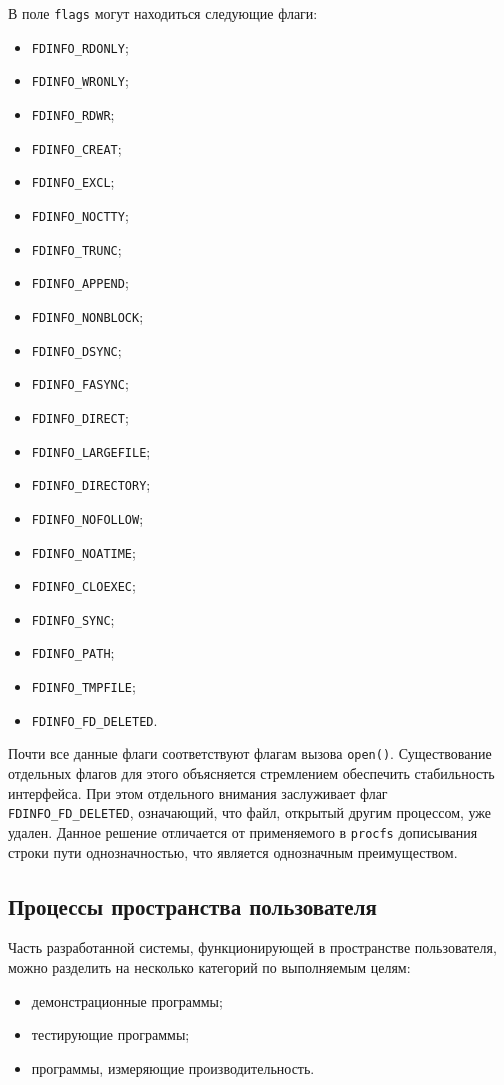 В поле \texttt{flags} могут находиться следующие флаги:
\begin{itemize}
\item \texttt{FDINFO\_RDONLY};
\item \texttt{FDINFO\_WRONLY};
\item \texttt{FDINFO\_RDWR};
\item \texttt{FDINFO\_CREAT}; 
\item \texttt{FDINFO\_EXCL};
\item \texttt{FDINFO\_NOCTTY};
\item \texttt{FDINFO\_TRUNC};
\item \texttt{FDINFO\_APPEND};
\item \texttt{FDINFO\_NONBLOCK};
\item \texttt{FDINFO\_DSYNC};
\item \texttt{FDINFO\_FASYNC};
\item \texttt{FDINFO\_DIRECT};
\item \texttt{FDINFO\_LARGEFILE};
\item \texttt{FDINFO\_DIRECTORY};
\item \texttt{FDINFO\_NOFOLLOW};
\item \texttt{FDINFO\_NOATIME};
\item \texttt{FDINFO\_CLOEXEC};
\item \texttt{FDINFO\_SYNC};
\item \texttt{FDINFO\_PATH};
\item \texttt{FDINFO\_TMPFILE};
\item \texttt{FDINFO\_FD\_DELETED}.
\end{itemize}

Почти все данные флаги соответствуют флагам вызова \texttt{open()}.
Существование отдельных флагов для этого объясняется стремлением обеспечить
стабильность интерфейса. При этом отдельного внимания заслуживает флаг
\texttt{FDINFO\_FD\_DELETED}, означающий, что файл, открытый другим процессом,
уже удален. Данное решение отличается от применяемого в \texttt{procfs}
дописывания строки пути однозначностью, что является однозначным преимуществом.

\subsection{Процессы пространства пользователя}

Часть разработанной системы, функционирующей в пространстве пользователя, можно
разделить на несколько категорий по выполняемым целям:
\begin{itemize}
\item демонстрационные программы;
\item тестирующие программы;
\item программы, измеряющие производительность.
\end{itemize}

